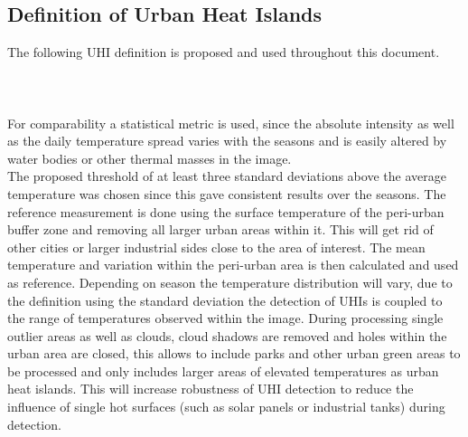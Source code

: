 \documentclass[12pt,a4paper, english,twoside]{scrartcl}
\begin{document}
    \subsection{Definition of Urban Heat Islands}\label{ssec:definition}
      The following \gls{UHI} definition is proposed and used throughout this document.\\
      \\
      \noindent{}\\ \\
      For comparability a statistical metric is used, since the absolute intensity as well as the daily temperature spread varies with the seasons 
      and is easily altered by water bodies or other thermal masses in the image.\\ 
      The proposed threshold of at least three standard deviations above the average temperature was chosen since this gave consistent results over the seasons. 
      The reference measurement is done using the surface temperature of the peri-urban buffer zone and removing all larger urban areas within it. 
      This will get rid of other cities or larger industrial sides close to the area of interest.
      The mean temperature and variation within the peri-urban area is then calculated and used as reference.
      Depending on season the temperature distribution will vary, due to the definition using the standard deviation the detection of \glspl{UHI} is coupled to the range of temperatures observed within the image. 
      During processing single outlier areas as well as clouds, cloud shadows are removed and holes within the urban area are closed, this allows to include parks and other urban green areas to be processed and only includes larger areas of elevated temperatures as urban heat islands. 
      This will increase robustness of \gls{UHI} detection to reduce the influence of single hot surfaces (such as solar panels or industrial tanks) during detection.
\end{document}
